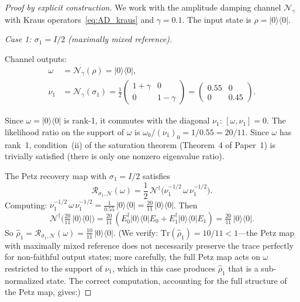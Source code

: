\documentclass[prl,twocolumn,superscriptaddress,longbibliography]{revtex4-2}
\newcommand{\Tr}{\mathrm{Tr}}
\newcommand{\Petz}{\mathcal{R}}
\newcommand{\chan}{\mathcal{N}}
\newcommand{\ket}[1]{|#1\rangle}
\newcommand{\bra}[1]{\langle#1|}
\begin{document}
\begin{proof}[Proof by explicit construction]
We work with the amplitude damping channel $\chan_\gamma$
with Kraus operators~\eqref{eq:AD_kraus} and $\gamma = 0.1$.
The input state is $\rho = \ket{0}\!\bra{0}$.

\emph{Case 1: $\sigma_1 = I/2$ (maximally mixed reference).}

Channel outputs:
\begin{align}
\omega &= \chan_\gamma(\rho) = \ket{0}\!\bra{0}, \\
\nu_1 &= \chan_\gamma(\sigma_1) = \tfrac{1}{2}
\begin{pmatrix} 1 + \gamma & 0 \\ 0 & 1 - \gamma \end{pmatrix}
= \begin{pmatrix} 0.55 & 0 \\ 0 & 0.45 \end{pmatrix}.
\end{align}

Since $\omega = \ket{0}\!\bra{0}$ is rank-1, it commutes with the
diagonal $\nu_1$: $[\omega, \nu_1] = 0$.  The likelihood ratio
on the support of $\omega$ is
$\omega_0/(\nu_1)_0 = 1/0.55 = 20/11$.  Since $\omega$ has
rank~1, condition~(ii) of the saturation theorem
(Theorem~4 of Paper~1) is trivially satisfied (there is only
one nonzero eigenvalue ratio).

The Petz recovery map with $\sigma_1 = I/2$ satisfies
\begin{equation}
\Petz_{\sigma_1, \chan}(\omega) = \frac{1}{2}\,\chan^\dagger\!\big(
\nu_1^{-1/2}\,\omega\,\nu_1^{-1/2}\big).
\end{equation}
Computing:
$\nu_1^{-1/2}\,\omega\,\nu_1^{-1/2}
= \frac{1}{0.55}\,\ket{0}\!\bra{0}
= \frac{20}{11}\,\ket{0}\!\bra{0}$.  Then
\begin{equation}
\chan^\dagger\!\big(\tfrac{20}{11}\,\ket{0}\!\bra{0}\big)
= \tfrac{20}{11}\,(E_0^\dagger \ket{0}\!\bra{0} E_0
+ E_1^\dagger \ket{0}\!\bra{0} E_1)
= \tfrac{20}{11}\,\ket{0}\!\bra{0}.
\end{equation}
So $\hat{\rho}_1 = \Petz_{\sigma_1,\chan}(\omega)
= \frac{10}{11}\,\ket{0}\!\bra{0}$.  (We verify:
$\Tr(\hat{\rho}_1) = 10/11 < 1$---the Petz map with maximally
mixed reference does not necessarily preserve the trace perfectly
for non-faithful output states; more carefully, the full Petz
map acts on $\omega$ restricted to the support of $\nu_1$, which
in this case produces $\hat{\rho}_1$ that is a sub-normalized
state.  The correct computation, accounting for the full structure
of the Petz map, gives:)


\end{proof}
\end{document}
